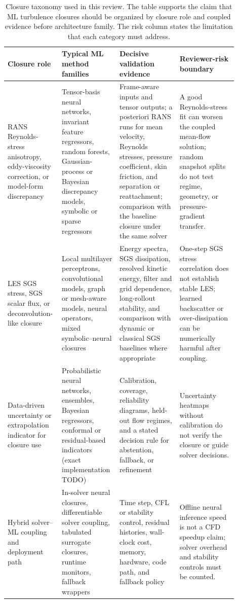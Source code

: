 \documentclass[11pt]{article}
\begin{document}
\begin{table}[t]
\centering
\small
\begin{tabular}{@{}p{0.19\linewidth}p{0.22\linewidth}p{0.25\linewidth}p{0.24\linewidth}@{}}
\toprule
Closure role & Typical ML method families & Decisive validation evidence & Reviewer-risk boundary \\
\midrule
RANS Reynolds-stress anisotropy, eddy-viscosity correction, or model-form discrepancy &
Tensor-basis neural networks, invariant feature regressors, random forests, Gaussian-process or Bayesian discrepancy models, symbolic or sparse regressors &
Frame-aware inputs and tensor outputs; a posteriori RANS runs for mean velocity, Reynolds stresses, pressure coefficient, skin friction, and separation or reattachment; comparison with the baseline closure under the same solver &
A good Reynolds-stress fit can worsen the coupled mean-flow solution; random snapshot splits do not test regime, geometry, or pressure-gradient transfer. \\
\addlinespace
LES SGS stress, SGS scalar flux, or deconvolution-like closure &
Local multilayer perceptrons, convolutional models, graph or mesh-aware models, neural operators, mixed symbolic--neural closures &
Energy spectra, SGS dissipation, resolved kinetic energy, filter and grid dependence, long-rollout stability, and comparison with dynamic or classical SGS baselines where appropriate &
One-step SGS stress correlation does not establish stable LES; learned backscatter or over-dissipation can be numerically harmful after coupling. \\
\addlinespace
Data-driven uncertainty or extrapolation indicator for closure use &
Probabilistic neural networks, ensembles, Bayesian regressors, conformal or residual-based indicators (exact implementation TODO) &
Calibration, coverage, reliability diagrams, held-out flow regimes, and a stated decision rule for abstention, fallback, or refinement &
Uncertainty heatmaps without calibration do not verify the closure or guide solver decisions. \\
\addlinespace
Hybrid solver--ML coupling and deployment path &
In-solver neural closures, differentiable solver coupling, tabulated surrogate closures, runtime monitors, fallback wrappers &
Time step, CFL or stability control, residual histories, wall-clock cost, memory, hardware, code path, and fallback policy &
Offline neural inference speed is not a CFD speedup claim; solver overhead and stability controls must be counted. \\
\bottomrule
\end{tabular}
\caption{Closure taxonomy used in this review. The table supports the claim that ML turbulence closures should be organized by closure role and coupled evidence before architecture family. The risk column states the limitation that each category must address.}
\label{tab:taxonomy}
\end{table}
\end{document}
